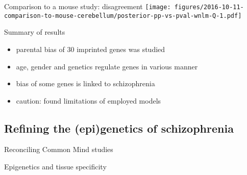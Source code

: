 \documentclass{beamer}
\newcommand{\ownfigscale}[0]{0.4}
\begin{document}
\begin{frame}{Comparison to a mouse study: disagreement}
\texttt{[image: figures/2016-10-11-comparison-to-mouse-cerebellum/posterior-pp-vs-pval-wnlm-Q-1.pdf]}
\end{frame}

\begin{frame}{Summary of results}
\begin{itemize}
\item parental bias of 30 imprinted genes was studied
\item age, gender and genetics regulate genes in various manner
\item bias of some genes is linked to schizophrenia 
\item caution: found limitations of employed models
\end{itemize}
\end{frame}





\subsection{Refining the (epi)genetics of schizophrenia}







\begin{frame}{Reconciling Common Mind studies}

\end{frame}

\begin{frame}{Epigenetics and tissue specificity}

\end{frame}
\end{document}
